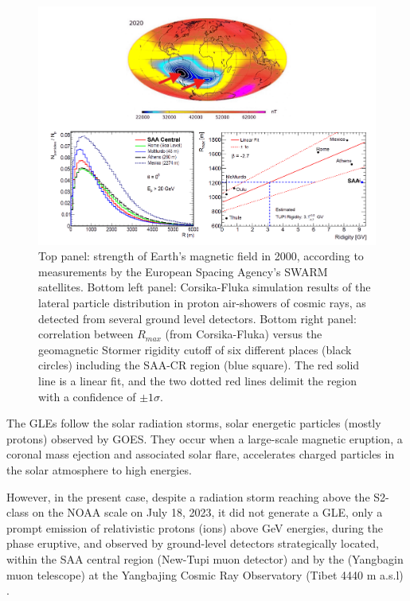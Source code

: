 \documentclass[twocolumn]{aastex63}
\begin{document}
\begin{figure}[th]
\vspace*{-0.0cm}
\hspace*{-0.0cm}
\centering
\includegraphics[clip,width=1.0
\textwidth,height=0.5\textheight,angle=0.] {Fig1.png}
\vspace*{-0.0cm}
\caption{Top panel: strength of Earth's magnetic field in 2000, according to measurements
by the European Spacing Agency's SWARM satellites.
Bottom left panel: Corsika-Fluka simulation results of the lateral particle distribution in proton air-showers of cosmic rays, 
as detected from several ground level detectors. Bottom right panel: correlation between $R_{max}$ (from Corsika-Fluka) versus the 
geomagnetic Stormer rigidity cutoff of six different places (black circles) including the SAA-CR region (blue square). The red solid line is a linear fit, and the two dotted red lines delimit the region 
with a confidence of 
$\pm 1 \sigma$.  }
\label{saa_tupi}
\end{figure} 
 
 
 The GLEs follow the solar radiation storms, solar energetic particles (mostly protons) observed by GOES. They occur when a large-scale magnetic eruption, a coronal mass ejection and associated solar flare, accelerates charged particles in the solar atmosphere to high energies.
 
However, in the present case, despite a radiation storm reaching above the S2-class on the NOAA scale on July 18, 2023, it did not generate a GLE, only a prompt emission of relativistic protons (ions) above GeV energies, during the phase eruptive,  and observed by ground-level detectors strategically located, within the SAA central region (New-Tupi muon detector) and by the (Yangbagin muon telescope) at the Yangbajing Cosmic Ray Observatory (Tibet 4440 m a.s.l) \citep{zhan10}.
\end{document}
